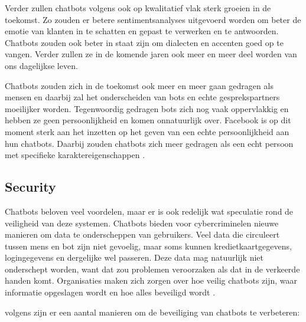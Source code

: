Verder zullen chatbots volgens \textcite{Patel2020} ook op kwalitatief vlak sterk groeien in de toekomst. Zo zouden er betere sentimentsanalyses uitgevoerd worden om beter de emotie van klanten in te schatten en gepast te verwerken en te antwoorden. Chatbots zouden ook beter in staat zijn om dialecten en accenten goed op te vangen. Verder zullen ze in de komende jaren ook meer en meer deel worden van ons dagelijkse leven.  

Chatbots zouden zich in de toekomst ook meer en meer gaan gedragen als mensen en daarbij zal het onderscheiden van bots en echte gesprekspartners moeilijker worden. Tegenwoordig gedragen bots zich nog vaak oppervlakkig en hebben ze geen persoonlijkheid en komen onnatuurlijk over. Facebook is op dit moment sterk aan het inzetten op het geven van een echte persoonlijkheid aan hun chatbots. Daarbij zouden chatbots zich meer gedragen als een echt persoon met specifieke karaktereigenschappen \autocite{Carey-Simos2018}.

\subsection{Security}
\label{subsec:security}

Chatbots beloven veel voordelen, maar er is ook redelijk wat speculatie rond de veiligheid van deze systemen. Chatbots bieden voor cybercriminelen nieuwe manieren om data te onderscheppen van gebruikers. Veel data die circuleert tussen mens en bot zijn niet gevoelig, maar soms kunnen kredietkaartgegevens, logingegevens en dergelijke wel passeren. Deze data mag natuurlijk niet onderschept worden, want dat zou problemen veroorzaken als dat in de verkeerde handen komt. Organisaties maken zich zorgen over hoe veilig chatbots zijn, waar informatie opgeslagen wordt en hoe alles beveiligd wordt \autocite{Shanbhag2018}.


volgens \textcite{Shanbhag2018} zijn er een aantal manieren om de beveiliging van chatbots te verbeteren:

